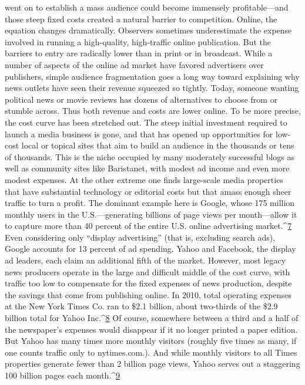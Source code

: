 went on to establish a mass audience could become immensely profitable—and
those steep fixed costs created a natural barrier to competition.
Online, the equation changes dramatically. Observers sometimes underestimate
the expense involved in running a high-quality, high-traffic online publication.
But the barriers to entry are radically lower than in print or in broadcast. While
a number of aspects of the online ad market have favored advertisers over publishers,
simple audience fragmentation goes a long way toward explaining why
news outlets have seen their revenue squeezed so tightly. Today, someone wanting
political news or movie reviews has dozens of alternatives to choose from or
stumble across.
Thus both revenue and costs are lower online. To be more precise, the cost
curve has been stretched out. The steep initial investment required to launch
a media business is gone, and that has opened up opportunities for low-cost
local or topical sites that aim to build an audience in the thousands or tens of
thousands. This is the niche occupied by many moderately successful blogs as
well as community sites like Baristanet, with modest ad income and even more
modest expenses.
At the other extreme one finds large-scale media properties that have substantial
technology or editorial costs but that amass enough sheer traffic to turn a
profit. The dominant example here is Google, whose 175 million monthly users
in the U.S.—generating billions of page views per month—allow it to capture
more than 40 percent of the entire U.S. online advertising market.^{\href{#endnotes-chapter-7}{7}} Even considering
only ``display advertising'' (that is, excluding search ads), Google accounts
for 13 percent of ad spending. Yahoo and Facebook, the display ad leaders, each
claim an additional fifth of the market.
However, most legacy news producers operate in the large and difficult middle
of the cost curve, with traffic too low to compensate for the fixed expenses
of news production, despite the savings that come from publishing online. In
2010, total operating expenses at the New York Times Co. ran to \$2.1 billion,
about two-thirds of the \$2.9 billion total for Yahoo Inc.^{\href{#endnotes-chapter-7}{8}} Of course, somewhere
between a third and a half of the newspaper's expenses would disappear if it no
longer printed a paper edition. But Yahoo has many times more monthly visitors
(roughly five times as many, if one counts traffic only to nytimes.com.). And
while monthly visitors to all Times properties generate fewer than 2 billion page
views, Yahoo serves out a staggering 100 billion pages each month.^{\href{#endnotes-chapter-7}{9}}
